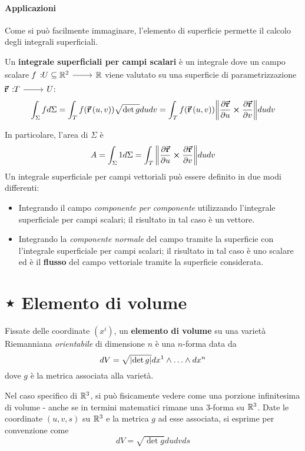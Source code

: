 \paragraph{Applicazioni}
Come si può facilmente immaginare, l'elemento di superficie permette il calcolo degli integrali superficiali.
\begin{define}
	Un \textbf{integrale superficiali per campi scalari} è un integrale dove un campo scalare $\funz[f]{U\subseteq\realset^2}{\realset}$ viene valutato su una superficie di parametrizzazione $\funz[\vba{r}]{T}{U}$:
	\begin{equation}
		\int_\Sigma fd\Sigma=\int_T f(\vb*{\va{r}}\left(u,v\right))\sqrt{\det g}dudv=\int_T f(\vb*{\va{r}}\left(u,v\right))\norm{\pdv{\vb*{\va{r}}}{u}\cross\pdv{\vb*{\va{r}}}{v}}dudv
	\end{equation}
\end{define}
In particolare, l'area di $\Sigma$ è
\begin{equation}
	A=\int_{\Sigma}1d\Sigma=\int_T\norm{\pdv{\vb*{\va{r}}}{u}\cross\pdv{\vb*{\va{r}}}{v}}dudv
\end{equation}
Un integrale superficiale per campi vettoriali può essere definito in due modi differenti:
\begin{itemize}
	\item Integrando il campo \textit{componente per componente} utilizzando l'integrale superficiale per campi scalari; il risultato in tal caso è un vettore.
	\item Integrando la \textit{componente normale} del campo tramite la superficie con l'integrale superficiale per campi scalari; il risultato in tal caso è uno scalare ed è il \textbf{flusso} del campo vettoriale tramite la superficie considerata.
\end{itemize}
\section{⋆ Elemento di volume}
\begin{define}
Fissate delle coordinate $\left(x^i\right)$, un \textbf{elemento di volume} su una varietà Riemanniana \textit{orientabile} di dimensione $n$ è una $n$-forma data da
\begin{equation}
	dV=\sqrt{\abs{\det g}}dx^1\wedge \ldots\wedge dx^n
\end{equation}
dove $g$ è la metrica associata alla varietà.
\end{define}
Nel caso specifico di $\mathbb{R}^3$, si può fisicamente vedere come una porzione infinitesima di volume - anche se in termini matematici rimane una 3-forma su $\mathbb{R}^3$. Date le coordinate $(u,v,s)$ su $\mathbb{R}^3$ e la metrica $g$ ad esse associata, si esprime per convenzione come
\begin{equation}
	dV=\sqrt{\det g}dudvds
\end{equation}
